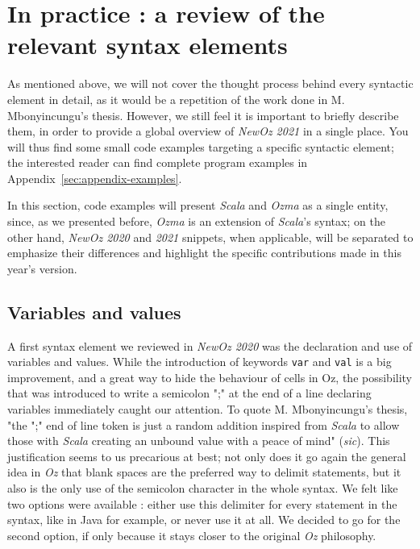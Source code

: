 \section{In practice : a review of the relevant syntax elements}\label{sec:ch2-review}
As mentioned above, we will not cover the thought process behind every syntactic element in detail, as it would be a repetition of the work done in M. Mbonyincungu's thesis.
However, we still feel it is important to briefly describe them, in order to provide a global overview of \textit{NewOz 2021} in a single place.\newline
You will thus find some small code examples targeting a specific syntactic element;
the interested reader can find complete program examples in Appendix~\ref{sec:appendix-examples}.\newline

In this section, code examples will present \textit{Scala} and \textit{Ozma} as a single entity, since, as we presented before, \textit{Ozma} is an extension of \textit{Scala}'s syntax;
on the other hand, \textit{NewOz 2020} and \textit{2021} snippets, when applicable, will be separated to emphasize their differences and highlight the specific contributions made in this year's version.

\subsection{Variables and values}
A first syntax element we reviewed in \textit{NewOz 2020} was the declaration and use of variables and values.
While the introduction of keywords \texttt{var} and \texttt{val} is a big improvement, and a great way to hide the behaviour of cells in Oz, the possibility that was introduced to write a semicolon ";" at the end of a line declaring variables immediately caught our attention.
To quote M. Mbonyincungu's thesis, "the ";" end of line token is just a random addition inspired from \textit{Scala} to allow those with \textit{Scala} creating an unbound value with a peace of mind" (\textit{sic}).
This justification seems to us precarious at best;
not only does it go again the general idea in \textit{Oz} that blank spaces are the preferred way to delimit statements, but it also is the only use of the semicolon character in the whole syntax.
We felt like two options were available : either use this delimiter for every statement in the syntax, like in Java for example, or never use it at all.
We decided to go for the second option, if only because it stays closer to the original \textit{Oz} philosophy.\newline

